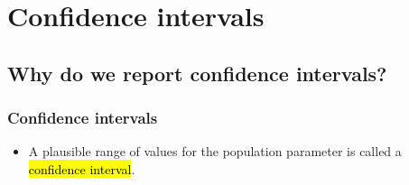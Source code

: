 
\section{Confidence intervals}


\subsection{Why do we report confidence intervals?}


\begin{frame}[shrink]
\frametitle{Confidence intervals}

\begin{itemize}

\item A plausible range of values for the population parameter is called a \hl{confidence interval}.


\end{itemize}
\end{frame}
